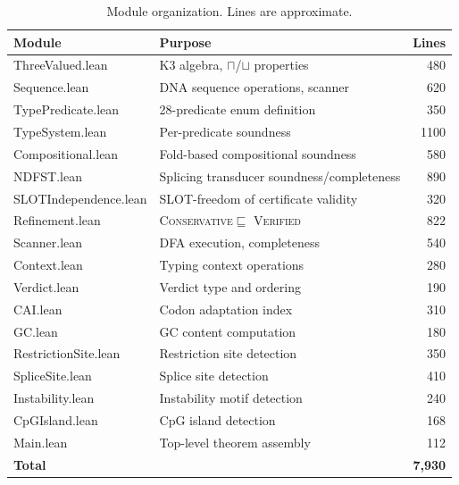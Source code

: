 \documentclass[sigplan,10pt,manuscript,review,anonymous]{acmart}
\newcommand{\tand}{\sqcap}
\newcommand{\CONSERVATIVE}{\textsc{Conservative}\xspace}
\newcommand{\VERIFIED}{\textsc{Verified}\xspace}
\begin{document}
\begin{table}[t]
\centering
\caption{Module organization. Lines are approximate.}
\label{tab:modules}
\begin{tabular}{llr}
\toprule
\textbf{Module} & \textbf{Purpose} & \textbf{Lines} \\
\midrule
ThreeValued.lean       & K3 algebra, $\tand$/$\sqcup$ properties & 480 \\
Sequence.lean          & DNA sequence operations, scanner          & 620 \\
TypePredicate.lean     & 28-predicate enum definition             & 350 \\
TypeSystem.lean        & Per-predicate soundness                  & 1100 \\
Compositional.lean     & Fold-based compositional soundness       & 580 \\
NDFST.lean             & Splicing transducer soundness/completeness & 890 \\
SLOTIndependence.lean  & SLOT-freedom of certificate validity     & 320 \\
Refinement.lean        & \CONSERVATIVE $\sqsubseteq$ \VERIFIED   & 822 \\
Scanner.lean           & DFA execution, completeness              & 540 \\
Context.lean           & Typing context operations                & 280 \\
Verdict.lean           & Verdict type and ordering                & 190 \\
CAI.lean               & Codon adaptation index                   & 310 \\
GC.lean                & GC content computation                   & 180 \\
RestrictionSite.lean   & Restriction site detection               & 350 \\
SpliceSite.lean        & Splice site detection                    & 410 \\
Instability.lean       & Instability motif detection              & 240 \\
CpGIsland.lean         & CpG island detection                     & 168 \\
Main.lean              & Top-level theorem assembly               & 112 \\
\midrule
\textbf{Total}         & & \textbf{7{,}930} \\
\bottomrule
\end{tabular}
\end{table}
\end{document}
